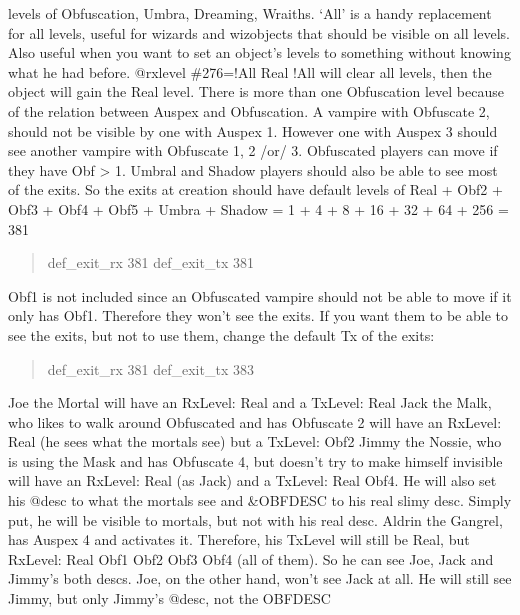 \documentclass[letterpaper,10pt,english]{sphinxmanual}
\begin{document}
 levels of Obfuscation, Umbra, Dreaming, Wraiths. ‘All’ is a handy
replacement for all levels, useful for wizards and wizobjects that should
be visible on all levels. Also useful when you want to set an object’s
levels to something without knowing what he had before.
@rxlevel \#276=!All Real
!All will clear all levels, then the object will gain the Real level.
There is more than one Obfuscation level because of the relation between
Auspex and Obfuscation.
A vampire with Obfuscate 2, should not be visible by one with Auspex 1.
However one with Auspex 3 should see another vampire with Obfuscate 1, 2
/or/ 3.
Obfuscated players can move if they have Obf \textgreater{} 1. Umbral and Shadow players
should also be able to see most of the exits. So the exits at creation
should have default levels of Real + Obf2 + Obf3 + Obf4 + Obf5 + Umbra +
Shadow = 1 + 4 + 8 + 16 + 32 + 64 + 256 = 381
\begin{quote}

\sphinxAtStartPar
def\_exit\_rx 381
def\_exit\_tx 381
\end{quote}

\sphinxAtStartPar
Obf1 is not included since an Obfuscated vampire should not be able to move
if it only has Obf1. Therefore they won’t see the exits. If you want them
to be able to see the exits, but not to use them, change the default Tx of
the exits:
\begin{quote}

\sphinxAtStartPar
def\_exit\_rx 381
def\_exit\_tx 383
\end{quote}

\sphinxAtStartPar
Joe the Mortal will have an RxLevel: Real and a TxLevel: Real
Jack the Malk, who likes to walk around Obfuscated and has Obfuscate 2 will
have an RxLevel: Real (he sees what the mortals see) but a TxLevel: Obf2
Jimmy the Nossie, who is using the Mask and has Obfuscate 4, but doesn’t
try to make himself invisible will have an RxLevel: Real (as Jack)
and a TxLevel: Real Obf4. He will also set his @desc to what the mortals see and
\&OBFDESC to his real slimy desc. Simply put, he will be visible to mortals,
but not with his real desc.
Aldrin the Gangrel, has Auspex 4 and activates it. Therefore, his TxLevel
will still be Real, but RxLevel: Real Obf1 Obf2 Obf3 Obf4 (all of them). So
he can see Joe, Jack and Jimmy’s both descs.
Joe, on the other hand, won’t see Jack at all. He will still see Jimmy, but
only Jimmy’s @desc, not the OBFDESC
\end{document}
